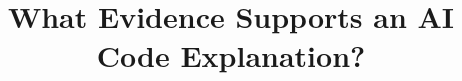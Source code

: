 \documentclass[10pt,conference]{IEEEtran}
\begin{document}
\title{What Evidence Supports an AI Code Explanation?}
\author{}
\maketitle









\clearpage
\nobalance


\end{document}
